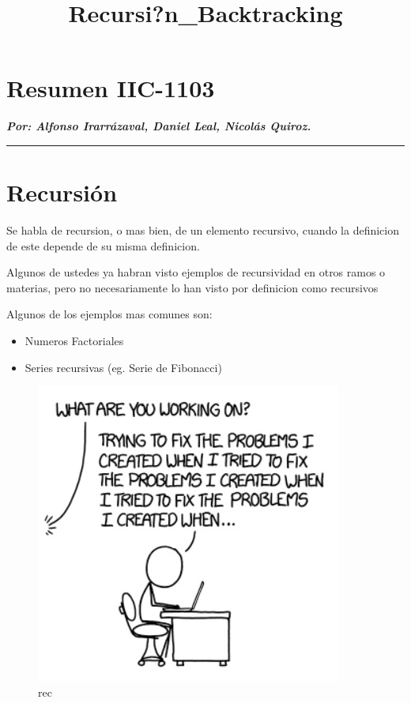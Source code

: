 \documentclass[11pt]{article}
\title{Recursi?n\_Backtracking}
\makeatletter
\def\maxwidth{\ifdim\Gin@nat@width>\linewidth\linewidth
    \else\Gin@nat@width\fi}
\let\Oldincludegraphics\includegraphics
\renewcommand{\includegraphics}[1]{\Oldincludegraphics[width=.8\maxwidth]{#1}}
\providecommand{\tightlist}{%
      \setlength{\itemsep}{0pt}\setlength{\parskip}{0pt}}
\makeatother
\begin{document}
    
    
    \maketitle
    
    

    
    \hypertarget{resumen-iic-1103}{%
\section{Resumen IIC-1103}\label{resumen-iic-1103}}

\textbf{\emph{Por: Alfonso Irarrázaval, Daniel Leal, Nicolás Quiroz.}}

\begin{center}\rule{0.5\linewidth}{\linethickness}\end{center}

\hypertarget{recursiuxf3n}{%
\section{Recursión}\label{recursiuxf3n}}

Se habla de recursion, o mas bien, de un elemento recursivo, cuando la
definicion de este depende de su misma definicion.

Algunos de ustedes ya habran visto ejemplos de recursividad en otros
ramos o materias, pero no necesariamente lo han visto por definicion
como recursivos

Algunos de los ejemplos mas comunes son:

\begin{itemize}
\tightlist
\item
  Numeros Factoriales
\item
  Series recursivas (eg. Serie de Fibonacci)
\end{itemize}

\begin{figure}
\centering
\includegraphics{imgs/fixing_problems.jpeg}
\caption{rec}
\end{figure}
\end{document}
